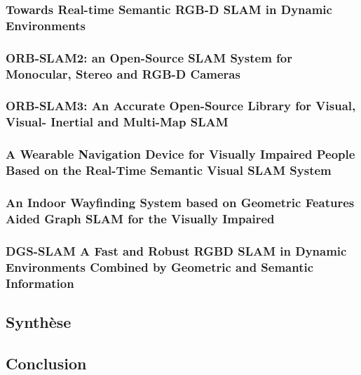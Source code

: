 \documentclass[11pt]{article}
\begin{document}
  \pagebreak
 
  \subsubsection{Towards Real-time Semantic RGB-D SLAM in Dynamic Environments}

  \pagebreak

  \subsubsection{ORB-SLAM2: an Open-Source SLAM System for Monocular, Stereo and
  RGB-D Cameras}  

  \pagebreak

  \subsubsection{ORB-SLAM3: An Accurate Open-Source Library for Visual, Visual-
  Inertial and Multi-Map SLAM}

  \pagebreak

  \subsubsection{A Wearable Navigation Device for Visually Impaired People Based on
  the Real-Time Semantic Visual SLAM System}

  \pagebreak

  \subsubsection{An Indoor Wayfinding System based on Geometric Features Aided
  Graph SLAM for the Visually Impaired}  

  \pagebreak
  
  \subsubsection{DGS-SLAM A Fast and Robust RGBD SLAM in Dynamic Environments
  Combined by Geometric and Semantic Information}

  \pagebreak


  \subsection{Synthèse}

  \pagebreak

  \subsection{Conclusion}
\end{document}
